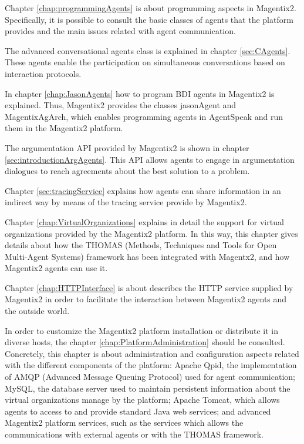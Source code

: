Chapter  \ref{chap:programmingAgents} is about programming aspects in Magentix2. Specifically, it is possible to consult  the basic classes of agents that the platform provides and the main issues related with agent communication. 

The advanced conversational agents class is explained in chapter \ref{sec:CAgents}. These agents enable the participation on simultaneous  conversations based on interaction protocols.

In chapter \ref{chap:JasonAgents} how to program BDI agents in Magentix2 is explained. Thus, Magentix2 provides the classes jasonAgent and MagentixAgArch, which enables programming agents in AgentSpeak and run them in the Magentix2 platform. 

The argumentation API provided by Magentix2 is shown in chapter \ref{sec:introductionArgAgents}. This API allows agents to engage in argumentation dialogues to reach agreements about the best solution to a problem. 


Chapter \ref{sec:tracingService} explains how agents can share information in an indirect way by means of the tracing service provide by Magentix2.
 



Chapter \ref{chap:VirtualOrganizations} explains in detail the support for virtual organizations provided by the Magentix2 platform. In this way, this chapter gives details about how the \textsc{THOMAS} (Methods, Techniques and Tools for Open Multi-Agent Systems) framework has been integrated with Magentx2, and how Magentix2 agents can use it. 

Chapter \ref{chap:HTTPInterface} is about describes the HTTP service supplied by Magentix2 in order to facilitate the interaction between Magentix2 agents and the outside world.


In order to customize the Magentix2 platform installation or distribute it in diverse hosts, the chapter \ref{chap:PlatformAdministration} should be consulted. Concretely, this chapter is about administration and configuration aspects related with the different components of the platform: Apache Qpid, the implementation of AMQP (Advanced Message Queuing Protocol) used for agent communication; MySQL, the database server used to maintain persistent information about the virtual organizations manage by the platform; Apache Tomcat, which allows agents to access to and provide standard Java web services; and  advanced Magentix2 platform services, such as the services which allows the communications with external agents or with the \textsc{THOMAS} framework. %

 

   

  
